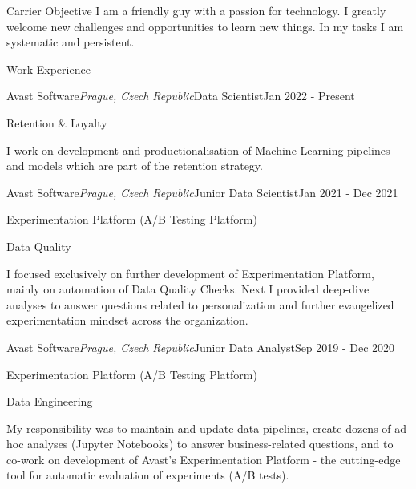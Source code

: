 \documentclass{resume} %
\begin{document}
\begin{rSection}{Carrier Objective}
I am a friendly guy with a passion for technology. I greatly welcome new challenges and opportunities to learn new things. In my tasks I am systematic and persistent.
\end{rSection}

\begin{rSection}{Work Experience}
 
    \begin{rSubsection}{Avast Software}{\em Prague, Czech Republic}{Data Scientist}{Jan 2022 - Present}
        \item Retention \& Loyalty
        
        I work on development and productionalisation of Machine Learning pipelines and models which are part of the retention strategy.

    \end{rSubsection}

    \begin{rSubsection}{Avast Software}{\em Prague, Czech Republic}{Junior Data Scientist}{Jan 2021 - Dec 2021}
        \item Experimentation Platform (A/B Testing Platform)
        \item Data Quality
        
        I focused exclusively on further development of Experimentation Platform, mainly on automation of Data Quality Checks. Next I provided deep-dive analyses to answer questions related to personalization and further evangelized experimentation mindset across the organization.
        
    \end{rSubsection}
        
    \begin{rSubsection}{Avast Software}{\em Prague, Czech Republic}{Junior Data Analyst}{Sep 2019 - Dec 2020}
        \item Experimentation Platform (A/B Testing Platform)
        \item Data Engineering
        
        My responsibility was to maintain and update data pipelines, create dozens of ad-hoc analyses (Jupyter Notebooks) to answer business-related questions, and to co-work on development of Avast's Experimentation Platform - the cutting-edge tool for automatic evaluation of experiments (A/B tests).
        

\end{rSubsection}
\end{rSection}
\end{document}
